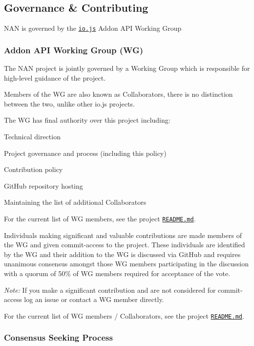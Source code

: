 \label{_governance}%
 \subsection*{Governance \& Contributing}

N\+AN is governed by the \href{https://iojs.org/}{\tt io.\+js} Addon A\+PI Working Group

\subsubsection*{Addon A\+PI Working Group (WG)}

The N\+AN project is jointly governed by a Working Group which is responsible for high-\/level guidance of the project.

Members of the WG are also known as Collaborators, there is no distinction between the two, unlike other io.\+js projects.

The WG has final authority over this project including\+:


\begin{DoxyItemize}
\item Technical direction
\item Project governance and process (including this policy)
\item Contribution policy
\item Git\+Hub repository hosting
\item Maintaining the list of additional Collaborators
\end{DoxyItemize}

For the current list of WG members, see the project \href{./README.md#collaborators}{\tt R\+E\+A\+D\+M\+E.\+md}.

Individuals making significant and valuable contributions are made members of the WG and given commit-\/access to the project. These individuals are identified by the WG and their addition to the WG is discussed via Git\+Hub and requires unanimous consensus amongst those WG members participating in the discussion with a quorum of 50\% of WG members required for acceptance of the vote.

{\itshape Note\+:} If you make a significant contribution and are not considered for commit-\/access log an issue or contact a WG member directly.

For the current list of WG members / Collaborators, see the project \href{./README.md#collaborators}{\tt R\+E\+A\+D\+M\+E.\+md}.

\subsubsection*{Consensus Seeking Process}

